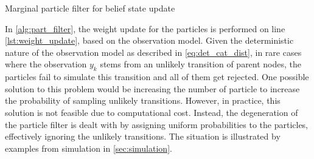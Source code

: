 \begin{algorithm}[H]
	
	\vspace{+4pt}
	\begin{algorithmic}[1]
		\\
		
		 \\
		 \label{lst:weight_update}
		\ENDFOR \\
		\\
		\\
		\ENDFOR 
	\end{algorithmic}
	\caption{Marginal particle filter for belief state update}
	\label{alg:part_filter}
\end{algorithm}
In \cref{alg:part_filter}, the weight update for the particles is performed on line \autoref{lst:weight_update}, based on the observation model. Given the deterministic nature of the observation model as described in \autoref{eq:det_cat_dist}, in rare cases where the observation $ y_k $ stems from an unlikely transition of parent nodes, the particles fail to simulate this transition and all of them get rejected. One possible solution to this problem would be increasing the number of particle to increase the probability of sampling unlikely transitions. However, in practice, this solution is not feasible due to computational cost. Instead, the degeneration of the particle filter is dealt with by assigning uniform probabilities to the particles, effectively ignoring the unlikely transitions. The situation is illustrated by examples from simulation in \cref{sec:simulation}.

